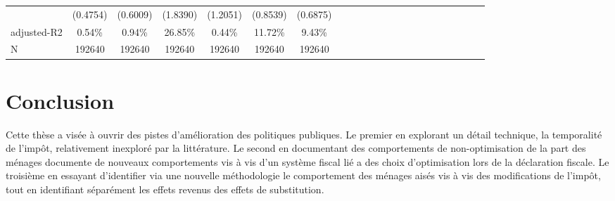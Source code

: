 \begin{subappendices}
{\begin{landscape}
\begin{table}[H]
{\begin{tabular}{lccccccccccccccccccccc}
                                                  & (0.4754)                &     (0.6009)               &   (1.8390)                     &  (1.2051)                    &                   (0.8539)       &       (0.6875)                             \\
\hdrule
\midrule
adjusted-R2                                       & 0.54\%                  &     0.94\%                 &   26.85\%                     &  0.44\%                       &                   11.72\%        &       9.43\%                                \\
N                                                 & 192640                  &     192640                 &   192640                       &  192640                      &                   192640         &       192640                               \\
\bottomrule
\end{tabular}
}
\end{table} 

\end{landscape}
}
\end{subappendices}
\restoregeometry 
{}

\newpage
  \chapter*{Conclusion}
Cette thèse a visée à ouvrir des pistes d'amélioration des politiques publiques. Le premier en explorant un détail technique, la temporalité de l'impôt, relativement inexploré par la littérature. Le second en documentant des comportements de non-optimisation de la part des ménages documente de nouveaux comportements vis à vis d'un système fiscal lié a des choix d'optimisation lors de la déclaration fiscale. Le troisième en essayant d'identifier via une nouvelle méthodologie le comportement des ménages aisés vis à vis des modifications de l'impôt, tout en identifiant séparément les effets revenus des effets de substitution.

%
%






\ifx\isEmbedded\undefined
\newpage
%

\else \fi